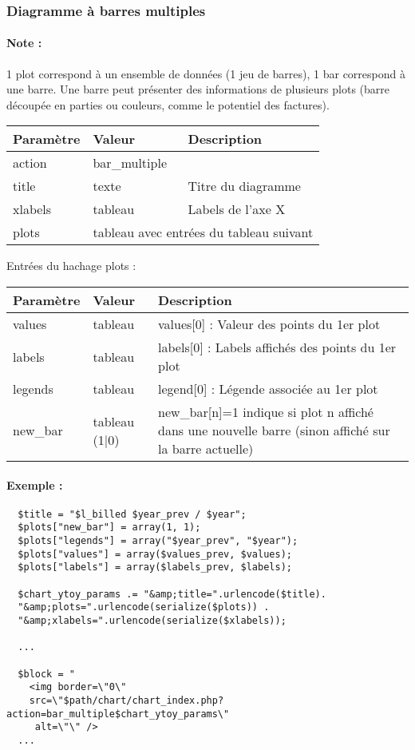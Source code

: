 \subsubsection{Diagramme à barres multiples}

\paragraph{Note :} 1 plot correspond à un ensemble de données (1 jeu de barres), 1 bar correspond à une barre. Une barre peut présenter des informations de plusieurs plots (barre découpée en parties ou couleurs, comme le potentiel des factures).\\

\begin{tabular}{|p{2cm}|p{3cm}|p{8cm}|}
\hline
\textbf{Paramètre} & \textbf{Valeur} & \textbf{Description}\\
\hline
action & bar\_multiple & \\ 
\hline
title & texte & Titre du diagramme \\
\hline
xlabels & tableau & Labels de l'axe X \\
\hline
plots & \multicolumn{2}{|c|}{tableau avec entrées du tableau suivant} \\
\hline
\end{tabular}
\vspace{0.3cm}

Entrées du hachage plots :\\

\begin{tabular}{|p{2cm}|p{3cm}|p{8cm}|}
\hline
\textbf{Paramètre} & \textbf{Valeur} & \textbf{Description}\\
\hline
values & tableau & values[0] : Valeur des points du 1er plot \\
\hline
labels & tableau & labels[0] : Labels affichés des points du 1er plot \\
\hline
legends & tableau & legend[0] : Légende associée au 1er plot \\
\hline
new\_bar & tableau (1|0) & new\_bar[n]=1 indique si plot n affiché dans une nouvelle barre (sinon affiché sur la barre actuelle) \\
\hline
\end{tabular}


\paragraph{Exemple :}

\begin{verbatim}
  $title = "$l_billed $year_prev / $year";
  $plots["new_bar"] = array(1, 1);
  $plots["legends"] = array("$year_prev", "$year");
  $plots["values"] = array($values_prev, $values);
  $plots["labels"] = array($labels_prev, $labels);

  $chart_ytoy_params .= "&amp;title=".urlencode($title).
  "&amp;plots=".urlencode(serialize($plots)) .
  "&amp;xlabels=".urlencode(serialize($xlabels));

  ...

  $block = "
    <img border=\"0\"
    src=\"$path/chart/chart_index.php?action=bar_multiple$chart_ytoy_params\"
     alt=\"\" />
  ...
\end{verbatim}
